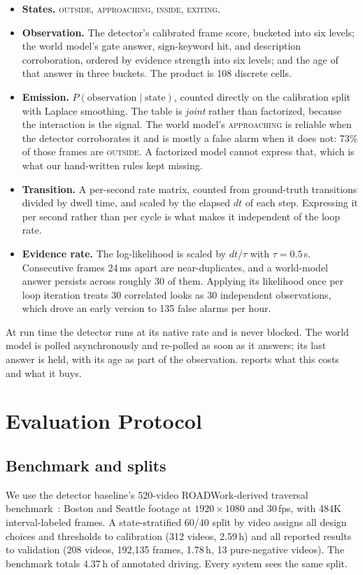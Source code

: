 \documentclass[journal]{IEEEtran}
\newcommand{\st}[1]{\textsc{#1}}
\begin{document}
\begin{itemize}
\item \textbf{States.} \st{outside}, \st{approaching}, \st{inside},
\st{exiting}.
\item \textbf{Observation.} The detector's calibrated frame score, bucketed into
six levels; the world model's gate answer, sign-keyword hit, and description corroboration, ordered by evidence strength into six levels; and the age of that answer in three buckets.  The product is 108 discrete cells.
\item \textbf{Emission.} $P(\text{observation} \mid \text{state})$, counted
directly on the calibration split with Laplace smoothing.  The table is \emph{joint} rather than factorized, because the interaction is the signal.  The world model's \st{approaching} is reliable when the detector corroborates it and is mostly a false alarm when it does not: 73\% of those frames are \st{outside}.  A factorized model cannot express that, which is what our hand-written rules kept missing.
\item \textbf{Transition.} A per-second rate matrix, counted from ground-truth
transitions divided by dwell time, and scaled by the elapsed $dt$ of each step. Expressing it per second rather than per cycle is what makes it independent of the loop rate.
\item \textbf{Evidence rate.} The log-likelihood is scaled by $dt/\tau$ with
$\tau = 0.5$\,s.  Consecutive frames 24\,ms apart are near-duplicates, and a world-model answer persists across roughly 30 of them.  Applying its likelihood once per loop iteration treats 30 correlated looks as 30 independent observations, which drove an early version to 135 false alarms per hour.
\end{itemize}

At run time the detector runs at its native rate and is never blocked.  The world model is polled asynchronously and re-polled as soon as it answers; its last answer is held, with its age as part of the observation.   reports what this costs and what it buys.

\section{Evaluation Protocol}
\label{sec:protocol}

\subsection{Benchmark and splits}
We use the detector baseline's 520-video ROADWork-derived traversal benchmark~\cite{priorsystem2026}: Boston and Seattle footage at $1920{\times}1080$ and 30\,fps, with 484K interval-labeled frames.  A state-stratified 60/40 split by video assigns all design choices and thresholds to calibration (312 videos, 2.59\,h) and all reported results to validation (208 videos, 192{,}135 frames, 1.78\,h, 13 pure-negative videos).  The benchmark totals 4.37\,h of annotated driving.  Every system sees the same split.
\end{document}
